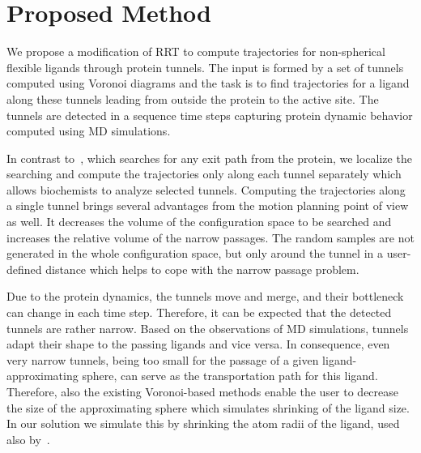 \documentclass[usletter, 10pt, conference]{ieeeconf} %
\begin{document}
{%


\section{Proposed Method}
We propose a modification of RRT to compute trajectories for non-spherical flexible ligands through protein tunnels.
The input is formed by a set of tunnels computed using Voronoi diagrams and the task is to find trajectories for a ligand along these tunnels
leading from outside the protein to the active site.
The tunnels are detected in a sequence time steps capturing protein dynamic behavior computed using MD simulations. 

In contrast to~\cite{cortes2010simulating}, which searches for any exit path from the protein, we localize the searching and compute the trajectories only along each tunnel separately which allows biochemists to analyze selected tunnels.
Computing the trajectories along a single tunnel brings several advantages from the motion planning point of view as well.
It decreases the volume of the configuration space to be searched and increases the relative volume of the narrow passages.
The random samples are not generated in the whole configuration space, but only around the tunnel in a user-defined distance which helps to cope with the narrow passage problem.

Due to the protein dynamics, the tunnels move and merge, and their bottleneck can change in each time step.
Therefore, it can be expected that the detected tunnels are rather narrow.
Based on the observations of MD simulations, tunnels adapt their shape to the passing ligands and vice versa.
In consequence, even very narrow tunnels, being too small for the passage of a given ligand-approximating sphere, can serve as the transportation path for this ligand.
Therefore, also the existing Voronoi-based methods enable the user to decrease the size of the approximating sphere which simulates shrinking of the ligand size.
In our solution we simulate this by shrinking the atom radii of the ligand, used also by~\cite{cortes2010simulating,guieysse2008structure}.

}
\end{document}

